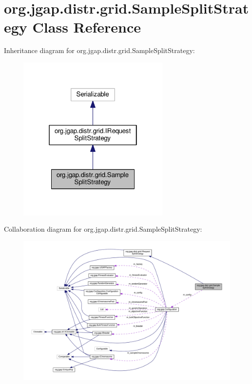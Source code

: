 \hypertarget{classorg_1_1jgap_1_1distr_1_1grid_1_1_sample_split_strategy}{\section{org.\-jgap.\-distr.\-grid.\-Sample\-Split\-Strategy Class Reference}
\label{classorg_1_1jgap_1_1distr_1_1grid_1_1_sample_split_strategy}
}


Inheritance diagram for org.\-jgap.\-distr.\-grid.\-Sample\-Split\-Strategy\-:
\nopagebreak
\begin{figure}[H]
\begin{center}
\leavevmode
\includegraphics[width=214pt]{classorg_1_1jgap_1_1distr_1_1grid_1_1_sample_split_strategy__inherit__graph}
\end{center}
\end{figure}


Collaboration diagram for org.\-jgap.\-distr.\-grid.\-Sample\-Split\-Strategy\-:
\nopagebreak
\begin{figure}[H]
\begin{center}
\leavevmode
\includegraphics[width=350pt]{classorg_1_1jgap_1_1distr_1_1grid_1_1_sample_split_strategy__coll__graph}
\end{center}
\end{figure}

